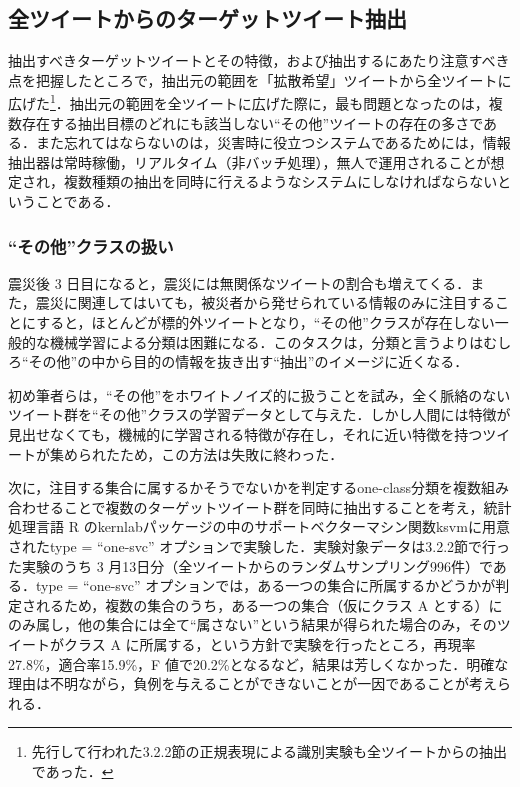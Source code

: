 \documentclass[japanese]{jnlp_1.4}
\begin{document}
\subsection{全ツイートからのターゲットツイート抽出}

抽出すべきターゲットツイートとその特徴，および抽出するにあたり注意すべき点を把握したところで，抽出元の範囲を「拡散希望」ツイートから全ツイートに広げた\footnote{ 
先行して行われた3.2.2節の正規表現による識別実験も全ツイートからの抽出であった．}．抽出元の範囲を全ツイートに広げた際に，最も問題となったのは，複数存在する抽出目標のどれにも該当しない``その他''ツイートの存在の多さである．また忘れてはならないのは，災害時に役立つシステムであるためには，情報抽出器は常時稼働，リアルタイム（非バッチ処理），無人で運用されることが想定され，複数種類の抽出を同時に行えるようなシステムにしなければならないということである．


\subsubsection{``その他''クラスの扱い}

震災後 3 日目になると，震災には無関係なツイートの割合も増えてくる．また，震災に関連してはいても，被災者から発せられている情報のみに注目することにすると，ほとんどが標的外ツイートとなり，``その他''クラスが存在しない一般的な機械学習による分類は困難になる．このタスクは，分類と言うよりはむしろ``その他''の中から目的の情報を抜き出す``抽出''のイメージに近くなる．

初め筆者らは，``その他''をホワイトノイズ的に扱うことを試み，全く脈絡のないツイート群を``その他''クラスの学習データとして与えた．しかし人間には特徴が見出せなくても，機械的に学習される特徴が存在し，それに近い特徴を持つツイートが集められたため，この方法は失敗に終わった．

次に，注目する集合に属するかそうでないかを判定するone-class分類を複数組み合わせることで複数のターゲットツイート群を同時に抽出することを考え，統計処理言語 R のkernlabパッケージの中のサポートベクターマシン関数ksvmに用意されたtype = ``one-svc'' オプションで実験した．実験対象データは3.2.2節で行った実験のうち 3 月13日分（全ツイートからのランダムサンプリング996件）である．type = ``one-svc'' オプションでは，ある一つの集合に所属するかどうかが判定されるため，複数の集合のうち，ある一つの集合（仮にクラス A とする）にのみ属し，他の集合には全て``属さない''という結果が得られた場合のみ，そのツイートがクラス A に所属する，という方針で実験を行ったところ，再現率27.8\%，適合率15.9\%，F 値で20.2\%となるなど，結果は芳しくなかった．明確な理由は不明ながら，負例を与えることができないことが一因であることが考えられる．
\end{document}
